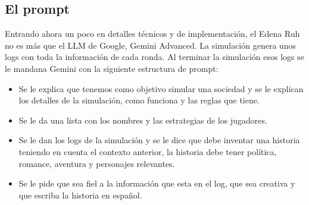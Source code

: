 \documentclass{article}
\begin{document}
\subsection{El prompt}
Entrando ahora un poco en detalles t\'ecnicos y de implementaci\'on, el Edena Ruh no es m\'as que el LLM de Google, Gemini Advanced. La simulación genera unos logs con toda la
informaci\'on de cada ronda. Al terminar la simulación esos logs se le mandana Gemini con la siguiente estructura de prompt:
\begin{itemize}
      \item Se le explica que tenemos como objetivo simular una sociedad y se le explican los detalles de la simulación, como funciona y las reglas que tiene.
      \item Se le da una lista con los nombres y las estrategias de los jugadores.
      \item Se le dan los logs de la simulación y se le dice que debe inventar una historia teniendo en cuenta el contexto anterior, la historia debe tener política, romance,
            aventura y personajes relevantes.
      \item Se le pide que sea fiel a la informaci\'on que esta en el log, que sea creativa y que escriba la historia en espa\~nol.
\end{itemize}
\end{document}
